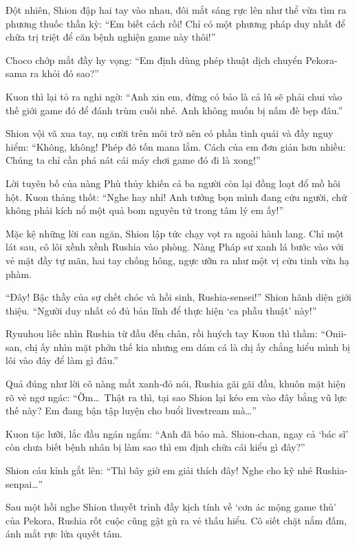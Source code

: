 \documentclass[../main.tex]{subfiles}
\begin{document}
Đột nhiên, Shion đập hai tay vào nhau, đôi mắt sáng rực lên như thể vừa tìm ra phương thuốc thần kỳ: ``Em biết cách rồi! Chỉ có một phương pháp duy nhất để chữa trị triệt để căn bệnh nghiện game này thôi!''

Choco chớp mắt đầy hy vọng: ``Em định dùng phép thuật dịch chuyển Pekora-sama ra khỏi đó sao?''

Kuon thì lại tỏ ra nghi ngờ: ``Anh xin em, đừng có bảo là cả lũ sẽ phải chui vào thế giới game đó để đánh trùm cuối nhé. Anh không muốn bị nấm đè bẹp đâu.''

Shion vội vã xua tay, nụ cười trên môi trở nên có phần tinh quái và đầy nguy hiểm: ``Không, không! Phép đó tốn mana lắm. Cách của em đơn giản hơn nhiều: Chúng ta chỉ cần phá nát cái máy chơi game đó đi là xong!''

Lời tuyên bố của nàng Phù thủy khiến cả ba người còn lại đồng loạt đổ mồ hôi hột. Kuon thảng thốt: ``Nghe hay nhỉ! Anh tưởng bọn mình đang cứu người, chứ không phải kích nổ một quả bom nguyên tử trong tâm lý em ấy!''

Mặc kệ những lời can ngăn, Shion lập tức chạy vọt ra ngoài hành lang. Chỉ một lát sau, cô lôi xềnh xềnh Rushia vào phòng. Nàng Pháp sư xanh lá bước vào với vẻ mặt đầy tự mãn, hai tay chống hông, ngực ưỡn ra như một vị cứu tinh vừa hạ phàm.


``Đây! Bậc thầy của sự chết chóc và hồi sinh, Rushia-sensei!'' Shion hãnh diện giới thiệu. ``Người duy nhất có đủ bản lĩnh để thực hiện `ca phẫu thuật' này!''

Ryuuhou liếc nhìn Rushia từ đầu đến chân, rồi huých tay Kuon thì thầm: ``Onii-san, chị ấy nhìn mặt phởn thế kia nhưng em dám cá là chị ấy chẳng hiểu mình bị lôi vào đây để làm gì đâu.''

Quả đúng như lời cô nàng mắt xanh-đỏ nói, Rushia gãi gãi đầu, khuôn mặt hiện rõ vẻ ngơ ngác: ``Ờm\dots\ Thật ra thì, tại sao Shion lại kéo em vào đây bằng vũ lực thế này? Em đang bận tập luyện cho buổi livestream mà\dots''

Kuon tặc lưỡi, lắc đầu ngán ngẩm: ``Anh đã bảo mà. Shion-chan, ngay cả `bác sĩ' còn chưa biết bệnh nhân bị làm sao thì em định chữa cái kiểu gì đây?''

Shion cáu kỉnh gắt lên: ``Thì bây giờ em giải thích đây! Nghe cho kỹ nhé Rushia-senpai\dots''

\ct

Sau một hồi nghe Shion thuyết trình đầy kịch tính về `cơn ác mộng game thủ' của Pekora, Rushia rốt cuộc cũng gật gù ra vẻ thấu hiểu. Cô siết chặt nắm đấm, ánh mắt rực lửa quyết tâm.
\end{document}
